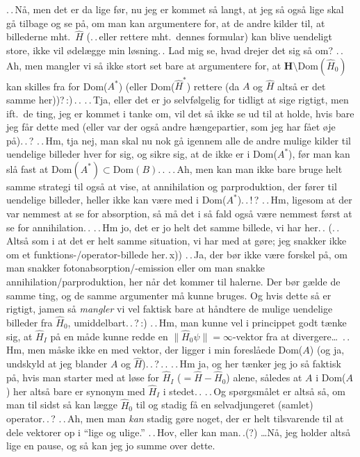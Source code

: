 \documentclass{report}
\begin{document}
.\,.\,Nå, men det er da lige før, nu jeg er kommet så langt, at jeg så også lige skal gå tilbage og se på, om man kan argumentere for, at de andre kilder til, at billederne mht.\ $\hat H$ (.\,.\,eller rettere mht.\ dennes formular) kan blive uendeligt store, ikke vil ødelægge min løsning.\,. Lad mig se, hvad drejer det sig så om? .\,.\,Ah, men mangler vi så ikke stort set bare at argumentere for, at $\mathrm{\textbf{H}} \setminus \mathrm{Dom}(\hat H_0)$ kan skilles fra for Dom($A^*$) (eller Dom($\hat H^*$) rettere (da $A$ og $\hat H$ altså er det samme her))?\,:)\,.\,. .\,.\,Tja, eller det er jo selvfølgelig for tidligt at sige rigtigt, men ift.\ de ting, jeg er kommet i tanke om, vil det så ikke se ud til at holde, hvis bare jeg får dette med (eller var der også andre hængepartier, som jeg har fået øje på).\,.\,? .\,.\,Hm, tja nej, man skal nu nok gå igennem alle de andre mulige kilder til uendelige billeder hver for sig, og sikre sig, at de ikke er i Dom($A^*$), før man kan slå fast at Dom$(A^*)\subset\mathrm{Dom}(B)$.\,. .\,.\,Ah, men kan man ikke bare bruge helt samme strategi til også at vise, at annihilation og parproduktion, der fører til uendelige billeder, heller ikke kan være med i Dom($A^*$).\,.\,!\,? .\,.\,Hm, ligesom at der var nemmest at se for absorption, så må det i så fald også være nemmest først at se for annihilation.\,. .\,.\,Hm jo, det er jo helt det samme billede, vi har her.\,. (.\,.\,Altså som i at det er helt samme situation, vi har med at gøre; jeg snakker ikke om et funktions-/operator-billede her.\,x)) .\,.\,Ja, der bør ikke være forskel på, om man snakker fotonabsorption/-emission eller om man snakke annihilation/parproduktion, her når det kommer til halerne. Der bør gælde de samme ting, og de samme argumenter må kunne bruges. Og hvis dette så er rigtigt, jamen så \emph{mangler} vi vel faktisk bare at håndtere de mulige uendelige billeder fra $\hat H_0$, umiddelbart.\,.\,?\,:) .\,.\,Hm, man kunne vel i princippet godt tænke sig, at $\hat H_I$ på en måde kunne redde en $\|\hat H_0 \psi \|= \infty$-vektor fra at divergere\ldots\ .\,.\,Hm, men måske ikke en med vektor, der ligger i min foreslåede Dom($A$) (og ja, undskyld at jeg blander $A$ og $\hat H$).\,.\,?\,.\,. .\,.\,Hm ja, og her tænker jeg jo så faktisk på, hvis man starter med at løse for $\hat H_I$ ($= \hat H - \hat H_0$) alene, således at $A$ i Dom($A$) her altså bare er synonym med $\hat H_I$ i stedet.\,. .\,.\,Og spørgsmålet er altså så, om man til sidst så kan lægge $\hat H_0$ til og stadig få en selvadjungeret (samlet) operator.\,.\,? .\,.\,Ah, men man \emph{kan} stadig gøre noget, der er helt tilsvarende til at dele vektorer op i ``lige og ulige.'' .\,.\,Hov, eller kan man.\,.(?) \ldots Nå, jeg holder altså lige en pause, og så kan jeg jo summe over dette.
\end{document}
